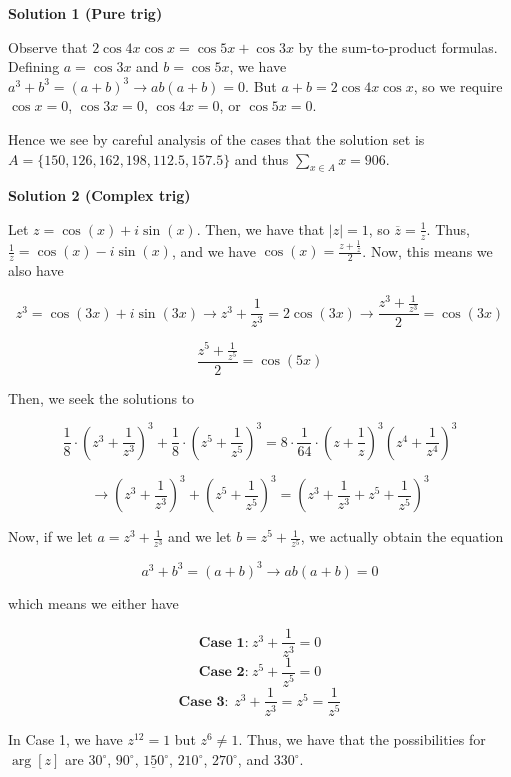 \begin{enumerate}
\textbf{Solution 1 (Pure trig)}

Observe that $2\cos 4x\cos x = \cos 5x + \cos 3x$ by the sum-to-product formulas. Defining $a = \cos 3x$ and $b = \cos 5x$, we have $a^3 + b^3 = (a+b)^3 \rightarrow ab(a+b) = 0$. But $a+b = 2\cos 4x\cos x$, so we require $\cos x = 0$, $\cos 3x = 0$, $\cos 4x = 0$, or $\cos 5x = 0$.

 Hence we see by careful analysis of the cases that the solution set is $A = \{150, 126, 162, 198, 112.5, 157.5\}$ and thus $\sum_{x \in A} x = \boxed{906}$.

 



\textbf{Solution 2 (Complex trig)}

Let $z=\cos(x)+i \sin(x)$. Then, we have that $|z|=1$, so $\overline{z}=\frac{1}{z}$. Thus, $\frac{1}{z}=\cos(x)-i \sin(x)$, and we have $\cos(x)=\frac{z+\frac{1}{z}}{2}$. Now, this means we also have

 
 \[z^{3}=\cos(3x)+i\sin(3x) \rightarrow z^{3}+\frac{1}{z^{3}} = 2\cos(3x) \rightarrow \frac{z^{3}+\frac{1}{z^{3}}}{2}=\cos(3x)\]

 \[\frac{z^{5}+\frac{1}{z^{5}}}{2}=\cos(5x)\]

 Then, we seek the solutions to 

 
 \[\frac{1}{8} \cdot \left(z^{3}+\frac{1}{z^{3}}\right)^{3} + \frac{1}{8} \cdot \left(z^{5}+\frac{1}{z^{5}}\right)^{3} = 8 \cdot \frac{1}{64} \cdot \left(z+\frac{1}{z}\right)^{3}\left(z^{4}+\frac{1}{z^{4}}\right)^{3}\]

 \[\rightarrow \left(z^{3}+\frac{1}{z^{3}}\right)^{3}+\left(z^{5}+\frac{1}{z^{5}}\right)^{3}=\left(z^{3}+\frac{1}{z^{3}}+z^{5}+\frac{1}{z^{5}}\right)^{3}\]

 Now, if we let $a=z^{3}+\frac{1}{z^{3}}$ and we let $b=z^{5}+\frac{1}{z^{5}}$, we actually obtain the equation

 
 \[a^{3}+b^{3}=(a+b)^{3} \rightarrow ab(a+b)=0\]

 which means we either have

 
 \[\textbf{Case 1:} \hspace{3pt} z^{3}+\frac{1}{z^{3}}=0\]
 \[\textbf{Case 2:} \hspace{3pt} z^{5}+\frac{1}{z^{5}}=0\]
 \[\textbf{Case 3:} \hspace{5pt} z^{3}+\frac{1}{z^{3}}=z^{5}=\frac{1}{z^{5}}\]

 In Case 1, we have $z^{12}=1$ but $z^{6} \neq 1$. Thus, we have that the possibilities for $\arg[z]$ are $30^\circ$, $90^\circ$, $\underline{150}^\circ$, $210^\circ$, $270^\circ$, and $330^\circ$. 


\end{enumerate}
